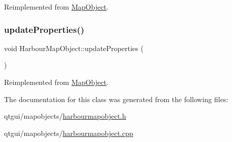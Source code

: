 Reimplemented from \mbox{\hyperlink{class_map_object_ac58ccb02d5d96d934939b217020c822c}{Map\+Object}}.

\mbox{\label{class_harbour_map_object_acffca3c0eb5fdd53e440dad3263d2b5c}} 
\subsubsection{\texorpdfstring{updateProperties()}{updateProperties()}}
{\footnotesize\ttfamily void Harbour\+Map\+Object\+::update\+Properties (\begin{DoxyParamCaption}{ }\end{DoxyParamCaption})\hspace{0.3cm}{\ttfamily [virtual]}}



Reimplemented from \mbox{\hyperlink{class_map_object_afa7cd6a4368f4dd077614ac1d983a6c8}{Map\+Object}}.



The documentation for this class was generated from the following files\+:\begin{DoxyCompactItemize}
\item 
qtgui/mapobjects/\mbox{\hyperlink{harbourmapobject_8h}{harbourmapobject.\+h}}\item 
qtgui/mapobjects/\mbox{\hyperlink{harbourmapobject_8cpp}{harbourmapobject.\+cpp}}\end{DoxyCompactItemize}
